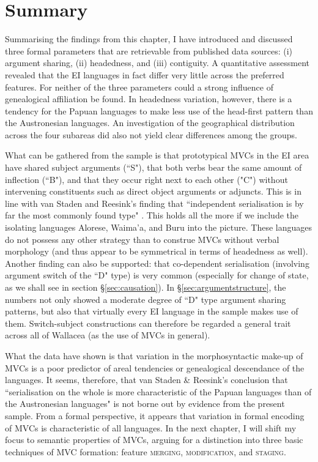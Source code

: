 \section{Summary}

Summarising the findings from this chapter, I have introduced and discussed three formal parameters that are retrievable from published data sources: (i) argument sharing, (ii) headedness, and (iii) contiguity. A quantitative assessment revealed that the EI languages in fact differ very little across the preferred features. For neither of the three parameters could a strong influence of genealogical affiliation be found. In headedness variation, however, there is a tendency for the Papuan languages to make less use of the head-first pattern than the Austronesian languages. An investigation of the geographical distribution across the four subareas did also not yield clear differences among the groups.

What can be gathered from the sample is that prototypical MVCs in the EI area have shared subject arguments (``S"), that both verbs bear the same amount of inflection (``B"), and that they occur right next to each other ("C") without intervening constituents such as direct object arguments or adjuncts. This is in line with van Staden and Reesink's finding that ``independent serialisation is by far the most commonly found type" \citep[48]{vanstaden2008serial}. This holds all the more if we include the isolating languages Alorese, Waima'a, and Buru into the picture. These languages do not possess any other strategy than to construe MVCs without verbal morphology (and thus appear to be symmetrical in terms of headedness as well). Another finding can also be supported: that co-dependent serialisation (involving argument switch of the ``D" type) is very common (especially for change of state, as we shall see in section §\ref{sec:causation}). In §\ref{sec:argumentstructure}, the numbers not only showed a moderate degree of ``D" type argument sharing patterns, but also that virtually every EI language in the sample makes use of them. Switch-subject constructions can therefore be regarded a general trait across all of Wallacea (as the use of MVCs in general).

What the data have shown is that variation in the morphosyntactic make-up of MVCs is a poor predictor of areal tendencies or genealogical descendance of the languages. It seems, therefore, that van Staden \& Reesink's conclusion that ``serialisation on the whole is more characteristic of the Papuan languages than of the Austronesian languages" \citep[50]{vanstaden2008serial} is not borne out by evidence from the present sample. From a formal perspective, it appears that variation in formal encoding of MVCs is characteristic of all languages. In the next chapter, I will shift my focus to semantic properties of MVCs, arguing for a distinction into three basic techniques of MVC formation: feature \textsc{merging}, \textsc{modification}, and \textsc{staging}.
